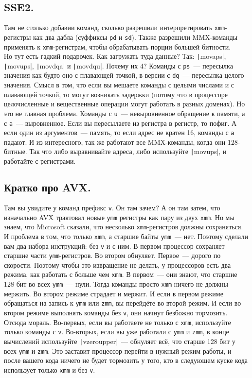 \documentclass{article}
\begin{document}
    \subsection{SSE2.}
    Там не столько добавии команд, сколько разрешили интерпретировать \Verb|xmm|-регистры как два дабла (суффиксы \Verb|pd| и \Verb|sd|). Также разрешили MMX-команды применять к \Verb|xmm|-регистрам, чтобы обрабатывать порции большей битности.\\
    Но тут есть гадкий подарочек. Как загружать туда данные? Так: \texttt|movaps|, \texttt|movups|, \texttt|movdqa| и \texttt|movdqu|. Почему их 4? Команды с \Verb|ps|~--- пересылка значения как будто оно с плавающей точкой, в версии с \Verb|dq|~--- пересылка целого значения. Смысл в том, что если вы мешаете команды с целыми числами и с плавающей точкой, то могут возникать задержки (потому что в процессоре целочисленные и вещественные операции могут работать в разных доменах). Но это не главная проблема. Команды с \Verb|u|~--- невыровненное обращение к памяти, а с \Verb|a|~--- выровненное. Если вы пересылаете из регистра в регистр, то пофиг. А если один из аргументов~--- память, то если адрес не кратен 16, команды с \Verb|a| падают. И из интересного, так же работают все MMX-команды, когда они 128-битные. Так что либо выравнивайте адреса, либо используйте \texttt|movups|, и работайте с регистрами.
    \subsection{Кратко про AVX.}
    Там вы увидите у команд префикс \Verb|v|. Он там зачем? А он там затем, что изначально AVX трактовал новые \Verb|ymm| регистры как пару из двух \Verb|xmm|. Но мы знаем, что Microsoft сказали, что несколько \Verb|xmm|-регистров должны сохраняться. И проблема в том, что только \Verb|xmm|, а старшие байты \Verb|ymm|~--- нет. Поэтому сделали вам два набора инструкций: без \Verb|v| и с ним. В первом процессор сохраняет старшие части \Verb|ymm|-регистров. Во втором обнуляет. Первое~--- дорого по скорости. Поэтому чтобы это извращение не делать, у процессоров есть два режима, как работать с больше чем \Verb|xmm|. В первом~--- они знают, что старшие 128 бит во всех \Verb|ymm|~--- нули. Тогда команды просто \Verb|xmm| ничего не должны мержить. Во втором режиме страдает и мержит. И если в первом режиме обращаться на запись к \Verb|ymm| или \Verb|zmm|, вы перейдёте во второй режим. И если во втором режиме выполнять команды без \Verb|v|, они начнут безбожно тормозить.\\
    Отсюда мораль. Во-первых, если вы работаете не только с \Verb|xmm|, используйте только команды с \Verb|v|. Во-вторых, если вы уже работали с \Verb|ymm| и \Verb|zmm|, в конце вычислений используйте \texttt|vzeroupper|~--- обнуляет всё, что старше 128 бит у всех \Verb|ymm| и \Verb|zmm|. Это заставит процессор перейти в нужный режим работы, и после вашего кода ничего не будет тормозить у того, кто в следующем куске кода использует только \Verb|xmm| и без \Verb|v|.
\end{document}
